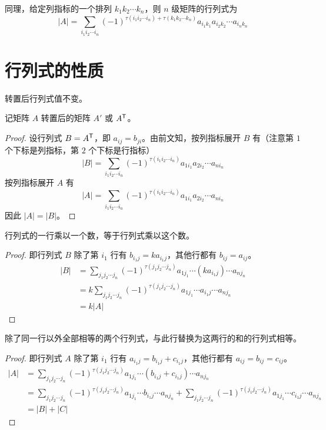 同理，给定列指标的一个排列 $k_1k_2\cdots k_n$，则 $n$ 级矩阵的行列式为
\[|A| = \sum_{i_1i_2\cdots i_n}(-1)^{\tau(i_1i_2\cdots i_n)+\tau(k_1k_2\cdots k_n)}a_{i_1k_1}a_{i_2k_2}\cdots a_{i_nk_n}\]

\section{行列式的性质}

\begin{theorem}
	转置后行列式值不变。
\end{theorem}

记矩阵 $A$ 转置后的矩阵 $A'$ 或 ${A}^\mathsf{T}$。

\begin{proof}
	设行列式 $B={A}^\mathsf{T}$，即 $a_{ij}=b_{ji}$。由前文知，按列指标展开 $B$ 有（注意第 $1$ 个下标是列指标，第 $2$ 个下标是行指标）
	\[|B|=\sum_{i_1i_2\cdots i_n}(-1)^{\tau(i_1i_2\cdots i_n)}a_{1i_1}a_{2i_2}\cdots a_{ni_n}\]
	按列指标展开 $A$ 有
	\[|A|=\sum_{i_1i_2\cdots i_n}(-1)^{\tau(i_1i_2\cdots i_n)}a_{1i_1}a_{2i_2}\cdots a_{ni_n}\]
	因此 $|A|=|B|$。
\end{proof}

\begin{theorem}
	行列式的一行乘以一个数，等于行列式乘以这个数。
\end{theorem}

\begin{proof}
	即行列式 $B$ 除了第 $i_1$ 行有 $b_{i_1j}=ka_{i_1j}$，其他行都有 $b_{ij}=a_{ij}$。
	\begin{equation*}
		\begin{aligned}
			|B| &= \sum_{j_1j_2\cdots j_n}(-1)^{\tau(j_1j_2\cdots j_n)}a_{1j_1}\cdots (ka_{i_1j}) \cdots a_{nj_n}\\
			&= k\sum_{j_1j_2\cdots j_n}(-1)^{\tau(j_1j_2\cdots j_n)}a_{1j_1}\cdots a_{i_1j} \cdots a_{nj_n}\\
			&=k|A|
		\end{aligned}
	\end{equation*}
\end{proof}

\begin{theorem}
	除了同一行以外全部相等的两个行列式，与此行替换为这两行的和的行列式相等。
\end{theorem}

\begin{proof}
	即行列式 $A$ 除了第 $i_1$ 行有 $a_{i_1j}=b_{i_1j}+c_{i_1j}$，其他行都有 $a_{ij}=b_{ij}=c_{ij}$。
	\begin{equation*}
		\begin{aligned}
			|A| &= \sum_{j_1j_2\cdots j_n}(-1)^{\tau(j_1j_2\cdots j_n)}a_{1j_1}\cdots (b_{i_1j}+c_{i_1j}) \cdots a_{nj_n}\\
			&= \sum_{j_1j_2\cdots j_n}(-1)^{\tau(j_1j_2\cdots j_n)}a_{1j_1}\cdots b_{i_1j} \cdots a_{nj_n}+\sum_{j_1j_2\cdots j_n}(-1)^{\tau(j_1j_2\cdots j_n)}a_{1j_1}\cdots c_{i_1j} \cdots a_{nj_n}\\
			&=|B|+|C|
		\end{aligned}
	\end{equation*}
\end{proof}


